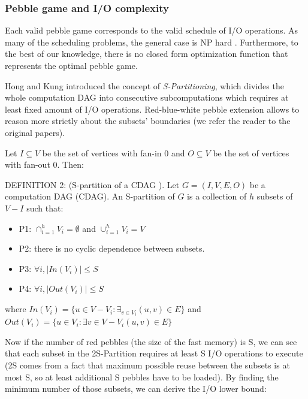 \documentclass[sigconf]{acmart}
\begin{document}
	\subsubsection{Pebble game and I/O complexity}
	Each valid pebble game corresponds to the valid schedule of I/O operations. 
	As many of the scheduling problems, the general case is NP hard 
	\cite{RedBlueHard}. 
	Furthermore, to the best of our knowledge, there is no closed form 
	optimization function that represents the optimal pebble game.
	
	Hong and Kung introduced the concept of \textit{S-Partitioning}, which 
	divides the whole computation DAG into consecutive subcomputations which 
	requires at least fixed amount of I/O operations. Red-blue-white pebble 
	extension allows to reason more strictly about the subsets' boundaries 
	(we refer the reader to the original papers).
	
	Let $I \subseteq V$ be the set of vertices with fan-in 0 and $O \subseteq 
	V$ be the set 
	of vertices with fan-out 0. Then:
	
	DEFINITION 2:  (S-partition of a CDAG \cite{redbluewhite}).
	Let $G = (I,V,E,O)$ be a computation DAG (CDAG). An S-partition of $G$ 
	is a 
	collection of 
	$h$ subsets of $V - I$ such that:
	
	\begin{itemize}
		\item P1: $\cap_{i=1}^{h} V_i=\emptyset$ and $\cup_{i=1}^{h} V_i=V$
		\item P2: there is no cyclic dependence between subsets.
		\item P3: $\forall i, |In(V_i)| \le S$
		\item P4: $\forall i, |Out(V_i)| \le S$
	\end{itemize}
	where $In(V_i) = \{u \in V - V_i : \exists_{v \in V_i}(u,v) \in E \}$ and 
	$Out(V_i) = \{u \in V_i: \exists{v \in V - V_i} (u,v) \in E \}$
	
	Now if the number of red pebbles (the size of the fast memory) is S, we can 
	see that each subset in the 2S-Partition requires at 
	least S I/O operations to execute (2S comes from a fact that maximum 
	possible reuse between the subsets is at most S, so at least additional S 
	pebbles have to be loaded). By finding the minimum number of 
	those subsets, we can derive the I/O lower bound:
	
\end{document}
